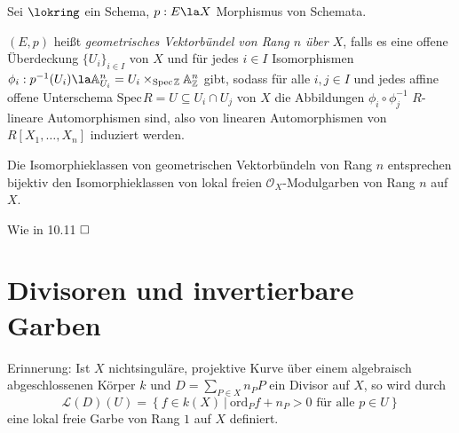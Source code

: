 \documentclass[11pt]{book}
\theoremstyle{nonumberbreak}
\newenvironment{pr}[1][]{\ifthenelse{\equal{#1}{}}{\proof}{\proof[#1]}\rm}{\endproof}
\newenvironment{ex}[1][]{\ifthenelse{\equal{#1}{}}{\example}{\example[#1]}\rm}{\endexample}
\newenvironment{definprop}[1][]{\ifthenelse{\equal{#1}{}}{\definiprop}{\definiprop[#1]}\rm}{\enddefiniprop}
\newcommand{\spec}{\mathrm{Spec} \hspace{1pt} }
\begin{document}
\begin{spacing}{1.4}
\begin{ex}
\end{ex}


\begin{definprop}

Sei $\lokring$ ein Schema, $p: E \la X$ Morphismus von Schemata.
\begin{compactenum}
\item $(E,p)$ heißt \textit{geometrisches Vektorbündel von Rang $n$ über $X$}, falls es eine offene Überdeckung $\{U_i\}_{i \in I}$ von $X$ und für jedes $i \in I$ Isomorphismen $\phi_i: p^{-1}(U_i) \la \mathbb{A}^n_{U_i} = U_i \times_{\spec \mathbb{Z}} \mathbb{A}^n_{\mathbb{Z}}$ gibt, sodass für alle $i,j \in I$ und jedes affine offene Unterschema $\spec R=U \subseteq U_i \cap U_j$ von $X$ die Abbildungen $\phi_i \circ \phi_j^{-1}$ $R$-lineare Automorphismen sind, also von linearen Automorphismen von $R[X_1, \ldots, X_n]$ induziert werden.
\item Die Isomorphieklassen von geometrischen Vektorbündeln von Rang $n$ entsprechen bijektiv den Isomorphieklassen von lokal freien $\mathcal{O}_X$-Modulgarben von Rang $n$ auf $X$.
\end{compactenum}
\begin{pr}
Wie in 10.11 $\hfill \Box$
\end{pr}
\end{definprop}


\renewcommand*\thesection{§ \arabic{section}\quad}
\section{Divisoren und invertierbare Garben} %
\renewcommand*\thesection{\arabic{section}}

Erinnerung: Ist $X$ nichtsinguläre, projektive Kurve über einem algebraisch abgeschlossenen Körper $k$ und $D= \sum_{P \in X} n_P P$ ein Divisor auf $X$, so wird durch 
$$\mathcal{L}(D)(U) = \left\{ f \in k(X) \ \vert \ \mathrm{ord}_Pf+ n_P >0  \textrm{ für alle } p \in U\right\}$$
eine lokal freie Garbe von Rang $1$ auf $X$ definiert.



\end{spacing}
\end{document}
